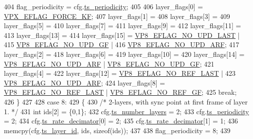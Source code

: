 \begin{DoxyCodeInclude}
{{{{{{{{{{{{{{{404         flag\_periodicity = cfg.\hyperlink{structvpx__codec__enc__cfg_a4ec338780115dd270acf0dac24193474}{ts\_periodicity};
405 
406         layer\_flags[0]  = \hyperlink{group__encoder_ga4c4f4e3cbb5225d2c6c050e2d1e948fa}{VPX\_EFLAG\_FORCE\_KF};
407         layer\_flags[1]  =
408         layer\_flags[3]  =
409         layer\_flags[5]  =
410         layer\_flags[7]  =
411         layer\_flags[9]  =
412         layer\_flags[11] =
413         layer\_flags[13] =
414         layer\_flags[15] = \hyperlink{group__vp8__encoder_ga602edb6b02a89cb2db7a16d6dffba583}{VP8\_EFLAG\_NO\_UPD\_LAST} |
415                           \hyperlink{group__vp8__encoder_gab01d066c5236457d345ce1cab4c41d6b}{VP8\_EFLAG\_NO\_UPD\_GF}   |
416                           \hyperlink{group__vp8__encoder_ga1cff46a5287e73a620660030d40b9e6c}{VP8\_EFLAG\_NO\_UPD\_ARF};
417         layer\_flags[2]  =
418         layer\_flags[6]  =
419         layer\_flags[10] =
420         layer\_flags[14] = \hyperlink{group__vp8__encoder_ga1cff46a5287e73a620660030d40b9e6c}{VP8\_EFLAG\_NO\_UPD\_ARF} | 
      \hyperlink{group__vp8__encoder_gab01d066c5236457d345ce1cab4c41d6b}{VP8\_EFLAG\_NO\_UPD\_GF};
421         layer\_flags[4]  =
422         layer\_flags[12] = \hyperlink{group__vp8__encoder_gafb51c67e5743275146bc1fc425727da3}{VP8\_EFLAG\_NO\_REF\_LAST} |
423                           \hyperlink{group__vp8__encoder_ga1cff46a5287e73a620660030d40b9e6c}{VP8\_EFLAG\_NO\_UPD\_ARF};
424         layer\_flags[8]  = \hyperlink{group__vp8__encoder_gafb51c67e5743275146bc1fc425727da3}{VP8\_EFLAG\_NO\_REF\_LAST} | 
      \hyperlink{group__vp8__encoder_gabb5e95343a2738abef44eca13059da33}{VP8\_EFLAG\_NO\_REF\_GF};
425         \textcolor{keywordflow}{break};
426     \}
427 
428     \textcolor{keywordflow}{case} 8:
429     \{
430         \textcolor{comment}{/* 2-layers, with sync point at first frame of layer 1. */}
431         \textcolor{keywordtype}{int} ids[2] = \{0,1\};
432         cfg.\hyperlink{structvpx__codec__enc__cfg_a16d4549a30cbd585e3c3056ef873d8c7}{ts\_number\_layers}     = 2;
433         cfg.\hyperlink{structvpx__codec__enc__cfg_a4ec338780115dd270acf0dac24193474}{ts\_periodicity}       = 2;
434         cfg.\hyperlink{structvpx__codec__enc__cfg_ad40c30846ef8ef1d8684f10a491ec535}{ts\_rate\_decimator}[0] = 2;
435         cfg.\hyperlink{structvpx__codec__enc__cfg_ad40c30846ef8ef1d8684f10a491ec535}{ts\_rate\_decimator}[1] = 1;
436         memcpy(cfg.\hyperlink{structvpx__codec__enc__cfg_a4d105d2470dbfb7210b33d298f1cf1f6}{ts\_layer\_id}, ids, \textcolor{keyword}{sizeof}(ids));
437 
438         flag\_periodicity = 8;
439 
}}}}}}}}}}}}}}}
\end{DoxyCodeInclude}
